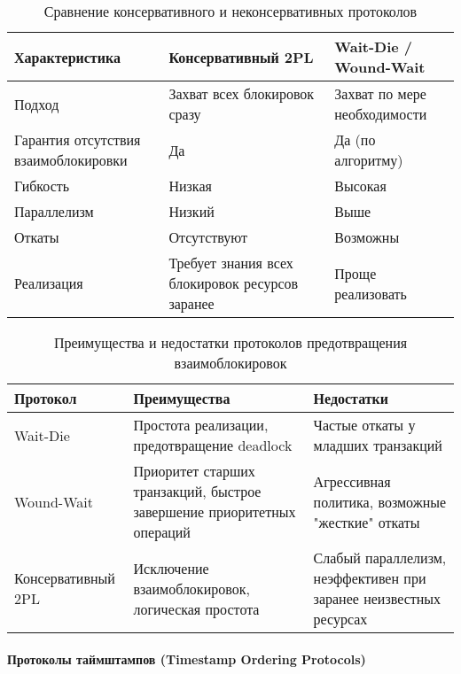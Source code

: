  \begin{table}[H]
     \centering
     \caption{Сравнение консервативного и неконсервативных протоколов}
     \begin{tabular}{|p{5cm}|p{5cm}|p{5cm}|}
         \hline
         \textbf{Характеристика} & \textbf{Консервативный 2PL} & \textbf{Wait-Die / Wound-Wait} \\
         \hline
         Подход & Захват всех блокировок сразу & Захват по мере необходимости \\
         \hline
         Гарантия отсутствия взаимоблокировки & Да & Да (по алгоритму) \\
         \hline
         Гибкость & Низкая & Высокая \\
         \hline
         Параллелизм & Низкий & Выше \\
         \hline
         Откаты & Отсутствуют & Возможны \\
         \hline
         Реализация & Требует знания всех блокировок ресурсов заранее & Проще реализовать \\
         \hline
     \end{tabular}
 \end{table}
     
 \begin{table}[H]
     \centering
     \caption{Преимущества и недостатки протоколов предотвращения взаимоблокировок}
     \begin{tabular}{|l|p{6cm}|p{6cm}|}
         \hline
         \textbf{Протокол} & \textbf{Преимущества} & \textbf{Недостатки} \\
         \hline
         Wait-Die & Простота реализации, предотвращение deadlock & Частые откаты у младших транзакций \\
         \hline
         Wound-Wait & Приоритет старших транзакций, быстрое завершение приоритетных операций & Агрессивная политика, возможные "жесткие" откаты \\
         \hline
         Консервативный 2PL & Исключение взаимоблокировок, логическая простота & Слабый параллелизм, неэффективен при заранее неизвестных ресурсах \\
         \hline
     \end{tabular}
 \end{table}
    
\paragraph{Протоколы таймштампов (Timestamp Ordering Protocols)} ~\\

